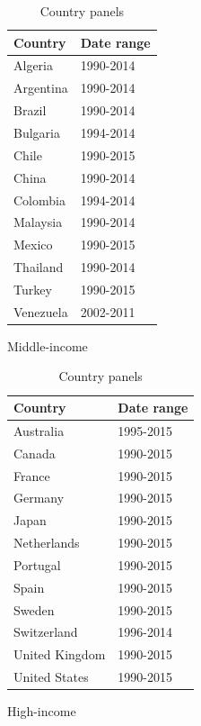 \documentclass[12pt,a4paper]{article}
\begin{document}
\begin{table}[htbp]
\centering
\begin{subtable}{0.45\textwidth}
\centering
\begin{tabular}{ll}
\toprule
   Country & Date range \\
\midrule
   Algeria &  1990-2014 \\
 Argentina &  1990-2014 \\
    Brazil &  1990-2014 \\
  Bulgaria &  1994-2014 \\
     Chile &  1990-2015 \\
     China &  1990-2014 \\
  Colombia &  1994-2014 \\
  Malaysia &  1990-2014 \\
    Mexico &  1990-2015 \\
  Thailand &  1990-2014 \\
    Turkey &  1990-2015 \\
 Venezuela &  2002-2011 \\
\bottomrule
\end{tabular}
\caption{Middle-income}
\end{subtable}
\begin{subtable}{0.45\textwidth}
\centering
\begin{tabular}{ll}
\toprule
        Country & Date range \\
\midrule
      Australia &  1995-2015 \\
         Canada &  1990-2015 \\
         France &  1990-2015 \\
        Germany &  1990-2015 \\
          Japan &  1990-2015 \\
    Netherlands &  1990-2015 \\
       Portugal &  1990-2015 \\
          Spain &  1990-2015 \\
         Sweden &  1990-2015 \\
    Switzerland &  1996-2014 \\
 United Kingdom &  1990-2015 \\
  United States &  1990-2015 \\
\bottomrule
\end{tabular}
\caption{High-income}
\end{subtable}
\caption{Country panels}
\label{tab:countries}
\end{table}
\end{document}
